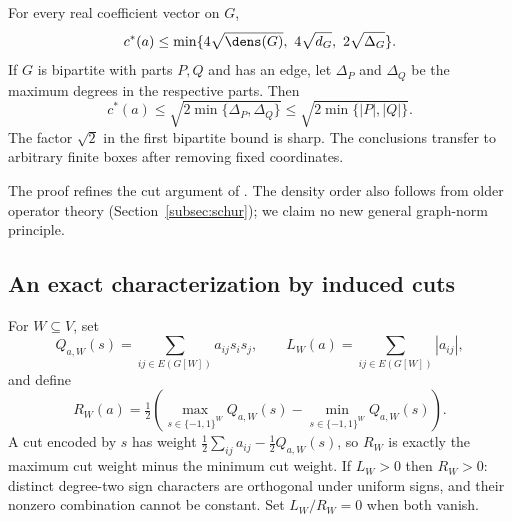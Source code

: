 \begin{theorem}\label{thm:bilinear-upper}
For every real coefficient vector on $G$,
\begin{equation}\label{eq:bilinear-upper}
 c^*(a)\le\min\{4\sqrt{\dens(G)},\ 4\sqrt{d_G},\ 2\sqrt{\Delta_G}\}.
\end{equation}
If $G$ is bipartite with parts $P,Q$ and has an edge, let $\Delta_P$ and
$\Delta_Q$ be the maximum degrees in the respective parts. Then
\begin{equation}\label{eq:bipartite-upper}
 c^*(a)\le\sqrt{2\min\{\Delta_P,\Delta_Q\}}
       \le\sqrt{2\min\{|P|,|Q|\}}.
\end{equation}
The factor $\sqrt2$ in the first bipartite bound is sharp. The conclusions
transfer to arbitrary finite boxes after removing fixed coordinates.
\end{theorem}
The proof refines the cut argument of \citet{Boland2017}. The density
order also follows from older operator theory
(Section~\ref{subsec:schur}); we claim no new general graph-norm principle.

\subsection{An exact characterization by induced cuts}
For $W\subseteq V$, set
\[
 Q_{a,W}(s)=\sum_{ij\in E(G[W])}a_{ij}s_is_j,\qquad
 L_W(a)=\sum_{ij\in E(G[W])}|a_{ij}|,
\]
and define
\begin{equation}\label{eq:cut-range}
 R_W(a)=\tfrac12\left(\max_{s\in\{-1,1\}^W}Q_{a,W}(s)
                         -\min_{s\in\{-1,1\}^W}Q_{a,W}(s)\right).
\end{equation}
A cut encoded by $s$ has weight $\tfrac12\sum_{ij}a_{ij}-\tfrac12Q_{a,W}(s)$,
so $R_W$ is exactly the maximum cut weight minus the minimum cut weight.
If $L_W>0$ then $R_W>0$: distinct degree-two sign characters are orthogonal
under uniform signs, and their nonzero combination cannot be constant.
Set $L_W/R_W=0$ when both vanish.


